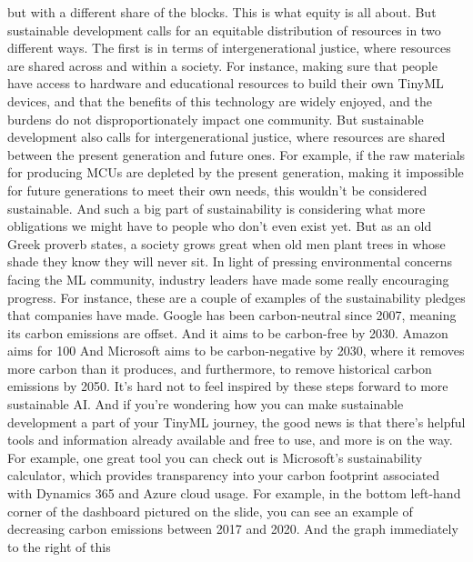 {{{{{{{{    but with a different share of the blocks.
    This is what equity is all about.
    But sustainable development calls for an equitable distribution
    of resources in two different ways.
    The first is in terms of intergenerational justice,
    where resources are shared across and within a society.
    For instance, making sure that people have access
    to hardware and educational resources to build their own TinyML devices,
    and that the benefits of this technology are widely
    enjoyed, and the burdens do not disproportionately
    impact one community.
    But sustainable development also calls for intergenerational justice,
    where resources are shared between the present generation and future ones.
    For example, if the raw materials for producing MCUs
    are depleted by the present generation, making
    it impossible for future generations to meet their own needs,
    this wouldn't be considered sustainable.
    And such a big part of sustainability is considering what
    more obligations we might have to people who don't even exist yet.
    But as an old Greek proverb states, a society
    grows great when old men plant trees in whose shade
    they know they will never sit.
    In light of pressing environmental concerns facing the ML community,
    industry leaders have made some really encouraging progress.
    For instance, these are a couple of examples of the sustainability pledges
    that companies have made.
    Google has been carbon-neutral since 2007,
    meaning its carbon emissions are offset.
    And it aims to be carbon-free by 2030.
    Amazon aims for 100%
    And Microsoft aims to be carbon-negative by 2030,
    where it removes more carbon than it produces,
    and furthermore, to remove historical carbon emissions by 2050.
    It's hard not to feel inspired by these steps forward to more sustainable AI.
    And if you're wondering how you can make sustainable development
    a part of your TinyML journey, the good news
    is that there's helpful tools and information already
    available and free to use, and more is on the way.
    For example, one great tool you can check out
    is Microsoft's sustainability calculator, which provides transparency
    into your carbon footprint associated with Dynamics 365 and Azure cloud
    usage.
    For example, in the bottom left-hand corner
    of the dashboard pictured on the slide, you
    can see an example of decreasing carbon emissions between 2017 and 2020.
    And the graph immediately to the right of this
}}}}}}}}
